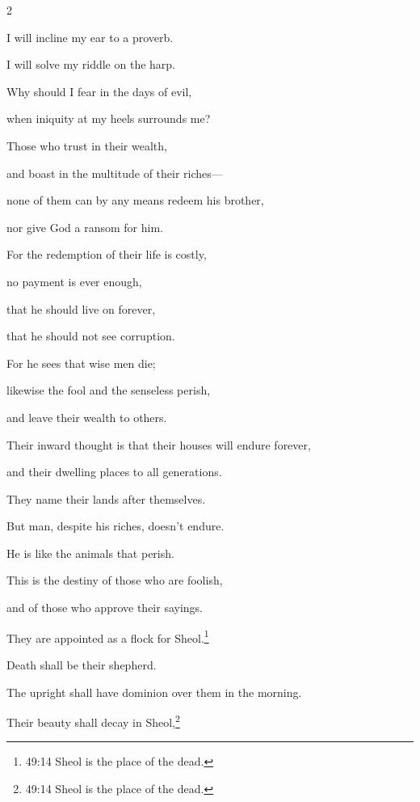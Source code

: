 \begin{multicols}{2}
	
	\myverse{}I will incline my ear to a proverb.
	
	I will solve my riddle on the harp.
	
	
	\myverse{}Why should I fear in the days of evil,
	
	when iniquity at my heels surrounds me?
	
	
	\myverse{}Those who trust in their wealth,
	
	and boast in the multitude of their riches---
	
	
	\myverse{}none of them can by any means redeem his brother,
	
	nor give God a ransom for him.
	
	
	\myverse{}For the redemption of their life is costly,
	
	no payment is ever enough,
	
	
	\myverse{}that he should live on forever,
	
	that he should not see corruption.
	
	
	\myverse{}For he sees that wise men die;
	
	likewise the fool and the senseless perish,
	
	and leave their wealth to others.
	
	
	\myverse{}Their inward thought is that their houses will endure forever,
	
	and their dwelling places to all generations.
	
	They name their lands after themselves.
	
	
	\myverse{}But man, despite his riches, doesn’t endure.
	
	He is like the animals that perish.
	
	\vspace{\baselineskip}
	
	\myverse{}This is the destiny of those who are foolish,
	
	and of those who approve their sayings.
	
	\vspace{\baselineskip}
	
	
	\myverse{}They are appointed as a flock for Sheol.\footnote{49:14 Sheol is the place of the dead.}
	
	Death shall be their shepherd.
	
	The upright shall have dominion over them in the morning.
	
	Their beauty shall decay in Sheol,\footnote{49:14 Sheol is the place of the dead.}
	

\end{multicols}
